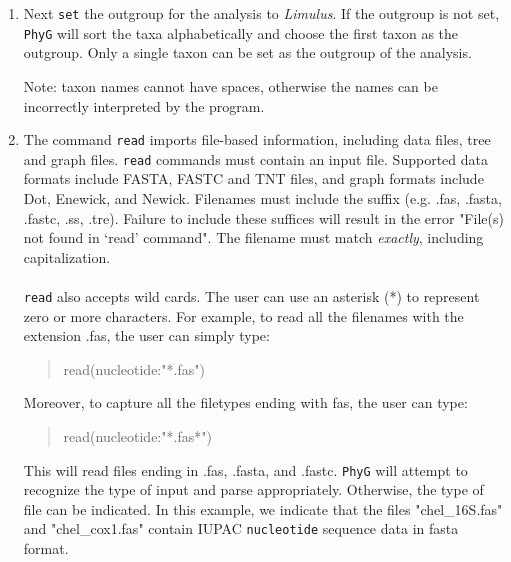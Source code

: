 \documentclass[]{article}
\newcommand{\phyg}{\texttt{PhyG} }
\begin{document}
\begin{enumerate}
Note: \phyg is a multi-threading application and will, by default, use all available cores. 
To guarantee the reproducibility of a given search each time the scripts is run, the user
should specify the same number of processors used by \phyg for each run.
This is achieved by including the options `+RTS -NX' where `X' is the number 
of processors offered to the program.

\item Next \texttt{set} the outgroup for the analysis to \textit{Limulus}. If the outgroup
is not set, \phyg will sort the taxa alphabetically and choose the first taxon as the
outgroup. Only a single taxon can be set as the outgroup of the analysis. 

Note: taxon names cannot have spaces, otherwise the names can be incorrectly 
interpreted by the program.

\item The command \texttt{read} imports file-based information, including data files, 
tree and graph files. \texttt{read} commands must contain an input file. Supported 
data formats include FASTA, FASTC and TNT files, and graph formats include Dot, 
Enewick, and Newick. Filenames must include the suffix (e.g. 
.fas, .fasta, .fastc, .ss, .tre). Failure to include these suffices will result in the error 
"File(s) not found in `read' command". The filename must match \textit{exactly}, 
including capitalization.\\
\\
\texttt{read} also accepts wild cards. The user can use an asterisk (*) to represent 
zero or more characters. For example, to read all the filenames with the extension .fas, 
the user can simply type:
        
        \begin{quote}
	read(nucleotide:"*.fas")\\
	\end{quote}
	
Moreover, to capture all the filetypes ending with fas, the user can type: 
	
	\begin{quote}
	read(nucleotide:"*.fas*")\\
	\end{quote}

This will read files ending in .fas, .fasta, and .fastc. \phyg will attempt to recognize 
the type of input and parse appropriately. Otherwise, the type of file can be 
indicated. In this example, we indicate that the files "chel\_16S.fas" and 
"chel\_cox1.fas" contain IUPAC \texttt{nucleotide} sequence data in fasta format.


\end{enumerate}
\end{document}
